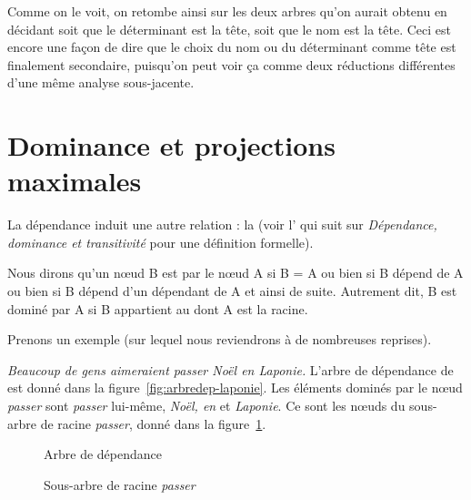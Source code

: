 {Comme on le voit, on retombe ainsi sur les deux arbres qu’on aurait obtenu en décidant soit que le déterminant est la tête, soit que le nom est la tête. Ceci est encore une façon de dire que le choix du nom ou du déterminant comme tête est finalement secondaire, puisqu’on peut voir ça comme deux réductions différentes d’une même analyse sous-jacente.}

\section{Dominance et projections maximales}\label{sec:3.3.30}\largerpage

La dépendance induit une autre relation : la  (voir l’ qui suit sur \textit{Dépendance, dominance et transitivité} pour une définition formelle).

{Nous dirons qu’un nœud B est  par le nœud A si B = A ou bien si B dépend de A ou bien si B dépend d’un dépendant de A et ainsi de suite. Autrement dit, B est dominé par A si B appartient au  dont A est la racine.}

Prenons un exemple (sur lequel nous reviendrons à de nombreuses reprises).

\ea\label{ex:laponie}
\textit{{
Beaucoup de gens aimeraient passer Noël en Laponie.
}}
\z
\noindent L’arbre de dépendance de  est donné dans la figure~\ref{fig:arbredep-laponie}. Les éléments dominés par le nœud \textit{passer} sont  \textit{passer} lui-même, \textit{Noël, en} et \textit{Laponie}. Ce sont les nœuds du sous-arbre de racine \textit{passer}, donné dans la figure~\ref{fig:sousarbre}.

\begin{figure}
\captionsetup{margin=.05\textwidth}%
    \begin{floatrow}%
    {\caption{\label{fig:arbredep-laponie}Arbre de dépendance}}%
    {\caption{\label{fig:sousarbre}Sous-arbre de racine \textit{passer}}}
    \end{floatrow}
\end{figure}



